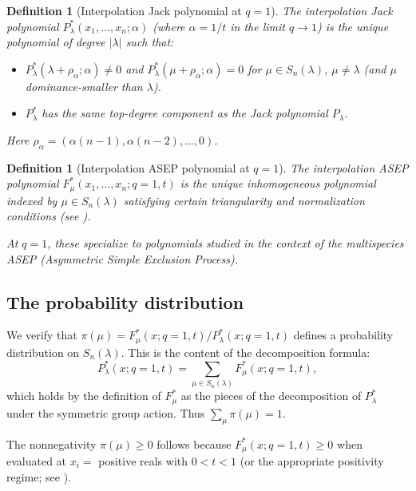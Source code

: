 \documentclass[12pt]{article}
\newtheorem{definition}[theorem]{Definition}
\begin{document}
\begin{definition}[Interpolation Jack polynomial at $q=1$]
The interpolation Jack polynomial $P^*_\lambda(x_1, \ldots, x_n; \alpha)$ (where $\alpha = 1/t$ in the limit $q \to 1$) is the unique polynomial of degree $|\lambda|$ such that:
\begin{itemize}
\item $P^*_\lambda(\lambda + \rho_\alpha; \alpha) \neq 0$ and $P^*_\lambda(\mu + \rho_\alpha; \alpha) = 0$ for $\mu \in S_n(\lambda)$, $\mu \neq \lambda$ (and $\mu$ dominance-smaller than $\lambda$).
\item $P^*_\lambda$ has the same top-degree component as the Jack polynomial $P_\lambda$.
\end{itemize}
Here $\rho_\alpha = (\alpha(n-1), \alpha(n-2), \ldots, 0)$.
\end{definition}

\begin{definition}[Interpolation ASEP polynomial at $q=1$]
The interpolation ASEP polynomial $F^*_\mu(x_1, \ldots, x_n; q{=}1, t)$ is the unique inhomogeneous polynomial indexed by $\mu \in S_n(\lambda)$ satisfying certain triangularity and normalization conditions (see \cite{Cantini2015,Corteel2021}).

At $q = 1$, these specialize to polynomials studied in the context of the multispecies ASEP (Asymmetric Simple Exclusion Process).
\end{definition}

\subsection{The probability distribution}

We verify that $\pi(\mu) = F^*_\mu(x; q{=}1, t) / P^*_\lambda(x; q{=}1, t)$ defines a probability distribution on $S_n(\lambda)$. This is the content of the decomposition formula:
\begin{equation}\label{eq:decomp}
P^*_\lambda(x; q{=}1, t) = \sum_{\mu \in S_n(\lambda)} F^*_\mu(x; q{=}1, t),
\end{equation}
which holds by the definition of $F^*_\mu$ as the pieces of the decomposition of $P^*_\lambda$ under the symmetric group action. Thus $\sum_\mu \pi(\mu) = 1$.

The nonnegativity $\pi(\mu) \geq 0$ follows because $F^*_\mu(x; q{=}1,t) \geq 0$ when evaluated at $x_i = $ positive reals with $0 < t < 1$ (or the appropriate positivity regime; see \cite{Cantini2015}).
\end{document}
